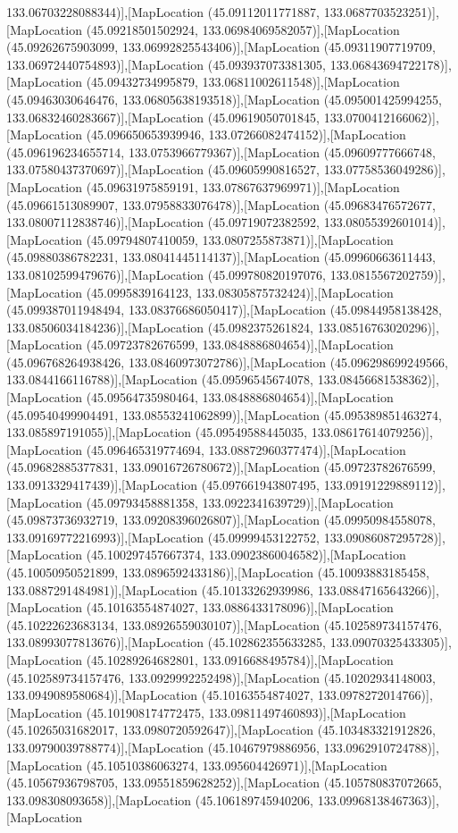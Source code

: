 133.06703228088344)],[MapLocation (45.09112011771887, 133.0687703523251)],[MapLocation (45.09218501502924, 133.06984069582057)],[MapLocation (45.09262675903099, 133.06992825543406)],[MapLocation (45.09311907719709, 133.06972440754893)],[MapLocation (45.093937073381305, 133.06843694722178)],[MapLocation (45.09432734995879, 133.06811002611548)],[MapLocation (45.09463030646476, 133.06805638193518)],[MapLocation (45.095001425994255, 133.06832460283667)],[MapLocation (45.09619050701845, 133.0700412166062)],[MapLocation (45.096650653939946, 133.07266082474152)],[MapLocation (45.096196234655714, 133.0753966779367)],[MapLocation (45.09609777666748, 133.07580437370697)],[MapLocation (45.09605990816527, 133.07758536049286)],[MapLocation (45.09631975859191, 133.07867637969971)],[MapLocation (45.09661513089907, 133.07958833076478)],[MapLocation (45.09683476572677, 133.08007112838746)],[MapLocation (45.09719072382592, 133.08055392601014)],[MapLocation (45.09794807410059, 133.0807255873871)],[MapLocation (45.09880386782231, 133.08041445114137)],[MapLocation (45.09960663611443, 133.08102599479676)],[MapLocation (45.099780820197076, 133.0815567202759)],[MapLocation (45.0995839164123, 133.08305875732424)],[MapLocation (45.099387011948494, 133.08376686050417)],[MapLocation (45.09844958138428, 133.08506034184236)],[MapLocation (45.0982375261824, 133.08516763020296)],[MapLocation (45.09723782676599, 133.0848886804654)],[MapLocation (45.096768264938426, 133.08460973072786)],[MapLocation (45.096298699249566, 133.0844166116788)],[MapLocation (45.09596545674078, 133.08456681538362)],[MapLocation (45.09564735980464, 133.0848886804654)],[MapLocation (45.09540499904491, 133.08553241062899)],[MapLocation (45.095389851463274, 133.085897191055)],[MapLocation (45.09549588445035, 133.08617614079256)],[MapLocation (45.096465319774694, 133.08872960377474)],[MapLocation (45.09682885377831, 133.09016726780672)],[MapLocation (45.09723782676599, 133.0913329417439)],[MapLocation (45.097661943807495, 133.09191229889112)],[MapLocation (45.09793458881358, 133.0922341639729)],[MapLocation (45.09873736932719, 133.09208396026807)],[MapLocation (45.09950984558078, 133.09169772216993)],[MapLocation (45.09999453122752, 133.09086087295728)],[MapLocation (45.100297457667374, 133.09023860046582)],[MapLocation (45.10050950521899, 133.0896592433186)],[MapLocation (45.10093883185458, 133.0887291484981)],[MapLocation (45.10133262939986, 133.08847165643266)],[MapLocation (45.10163554874027, 133.0886433178096)],[MapLocation (45.10222623683134, 133.08926559030107)],[MapLocation (45.102589734157476, 133.08993077813676)],[MapLocation (45.102862355633285, 133.09070325433305)],[MapLocation (45.10289264682801, 133.0916688495784)],[MapLocation (45.102589734157476, 133.0929992252498)],[MapLocation (45.10202934148003, 133.0949089580684)],[MapLocation (45.10163554874027, 133.0978272014766)],[MapLocation (45.101908174772475, 133.09811497460893)],[MapLocation (45.10265031682017, 133.0980720592647)],[MapLocation (45.103483321912826, 133.09790039788774)],[MapLocation (45.10467979886956, 133.0962910724788)],[MapLocation (45.10510386063274, 133.095604426971)],[MapLocation (45.10567936798705, 133.09551859628252)],[MapLocation (45.105780837072665, 133.098308093658)],[MapLocation (45.106189745940206, 133.09968138467363)],[MapLocation 